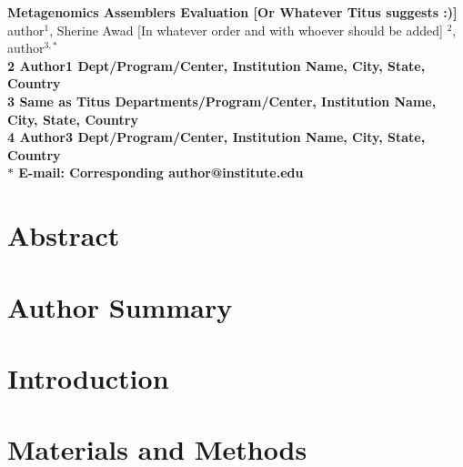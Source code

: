 





\begin{flushleft}
{\Large
\textbf{Metagenomics Assemblers Evaluation [Or Whatever Titus suggests :)] }
}
\\
 
author$^{1}$, 
Sherine Awad [In whatever order and with whoever should be added] $^{2}$, 
author$^{3,\ast}$
\\
\bf{2} Author1  Dept/Program/Center, Institution Name, City, State, Country
\\
\bf{3} Same as Titus Departments/Program/Center, Institution Name, City, State, Country
\\
\bf{4} Author3 Dept/Program/Center, Institution Name, City, State, Country
\\
$\ast$ E-mail: Corresponding author@institute.edu
\end{flushleft}

\section*{Abstract}

\section*{Author Summary}



\section*{Introduction}




\section*{Materials and Methods}


